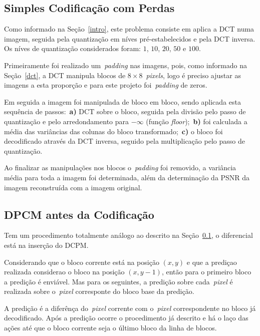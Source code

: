 \documentclass[conference]{Trabalho_3}
\begin{document}
\subsection{Simples Codifica\c{c}\~ao com Perdas}
  \label{codilossy_metodo}
Como informado na Se\c{c}\~ao~\ref{intro}, este problema consiste em aplica a DCT numa imagem, seguida pela quantiza\c{c}\~ao em n\'ives pr\'e-estabelecidos e pela DCT inversa. Os n\'ives de quantiza\c{c}\~ao considerados foram: $1$, $10$, $20$, $50$ e $100$.

Primeiramente foi realizado um~\textit{padding} nas imagens, pois, como informado na Se\c{c}\~ao~\ref{dct}, a DCT manipula blocos de ${8 \times 8}$~\textit{pixels}, logo \'e preciso ajustar as imagens a esta propor\c{c}\~ao e para este projeto foi~\textit{padding} de zeros.

Em seguida a imagem foi manipulada de bloco em bloco, sendo aplicada esta sequ\^encia de passos:~\textbf{a)} DCT sobre o bloco, seguida pela divis\~ao pelo passo de quantiza\c{c}\~ao e pelo arredondamento para $-\infty$ (fun\c{c}\~ao \textit{floor});~\textbf{b)} foi calculada a m\'edia das vari\^ancias das colunas do bloco transformado;~\textbf{c)} o bloco foi decodificado atrav\'es da DCT inversa, seguido pela multiplica\c{c}\~ao pelo passo de quantiza\c{c}\~ao.

Ao finalizar as manipula\c{c}\~oes nos blocos o~\textit{padding} foi removido, a vari\^ancia m\'edia para toda a imagem foi determinada, al\'em da determina\c{c}\~ao da PSNR da imagem reconstru\'ida com a imagem original.

\subsection{DPCM antes da Codifica\c{c}\~ao}
  \label{dpcmlossy_metodo}
Tem um procedimento totalmente an\'alogo ao descrito na Se\c{c}\~ao~\ref{codilossy_metodo}, o diferencial est\'a na inser\c{c}\~ao do DCPM.

Considerando que o bloco corrente est\'a na posi\c{c}\~ao $(x, y)$ e que a predi\c{c}ao realizada considerao o bloco na posi\c{c}\~ao $(x, y - 1)$, ent\~ao para o primeiro bloco a predi\c{c}\~ao \'e envi\'avel. Mas para os seguintes, a predi\c{c}\~ao sobre cada~\textit{pixel} \'e realizada sobre o~\textit{pixel} corresponte do bloco base da predi\c{c}\~ao.

A predi\c{c}\~ao \'e a difer\^en\c{c}a do~\textit{pixel} corrente com o~\textit{pixel} correspondente no bloco j\'a decodificado. Ap\'os a predi\c{c}\~ao ocorre o procedimento j\'a descrito e h\'a o la\c{c}o das a\c{c}\~oes at\'e que o bloco corrente seja o \'ultimo bloco da linha de blocos.
\end{document}
